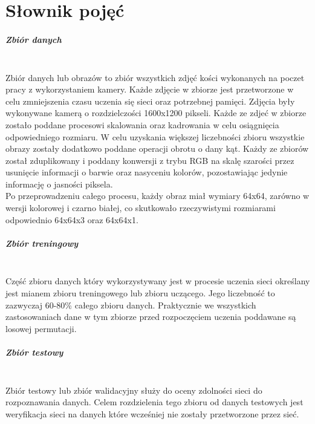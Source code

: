 
\chapter{Słownik pojęć}

\paragraph{Zbiór danych} \mbox{}\\
Zbiór danych lub obrazów to zbiór wszystkich zdjęć kości wykonanych na poczet
pracy z wykorzystaniem kamery. Każde zdjęcie w zbiorze jest przetworzone w celu
zmniejszenia czasu uczenia się sieci oraz potrzebnej pamięci. Zdjęcia były wykonywane
kamerą o rozdzielczości 1600x1200 pikseli. Każde ze zdjeć w zbiorze zostało
poddane procesowi skalowania oraz kadrowania w celu osiągnięcia odpowiedniego
rozmiaru. W celu uzyskania większej liczebności zbioru wszystkie obrazy zostały
dodatkowo poddane operacji obrotu o dany kąt. Każdy ze zbiorów został zduplikowany
i poddany konwersji z trybu RGB na skalę szarości przez usunięcie informacji o barwie
oraz nasyceniu kolorów, pozostawiając jedynie informację o jasności piksela. \\
Po przeprowadzeniu całego procesu, każdy obraz miał wymiary 64x64, zarówno w wersji
kolorowej i czarno białej, co skutkowało rzeczywistymi rozmiarami odpowiednio 64x64x3
oraz 64x64x1.

\paragraph{Zbiór treningowy} \mbox{}\\
Część zbioru danych który wykorzystywany jest w procesie uczenia sieci określany
jest mianem zbioru treningowego lub zbioru uczącego. Jego liczebność to zazwyczaj 60-80\% całego zbioru
danych. Praktycznie we wszystkich zastosowaniach dane w tym zbiorze przed rozpoczęciem
uczenia poddawane są losowej permutacji.

\paragraph{Zbiór testowy} \mbox{}\\
Zbiór testowy lub zbiór walidacyjny służy do oceny zdolności sieci do rozpoznawania
danych. Celem rozdzielenia tego zbioru od danych testowych jest weryfikacja sieci
na danych które wcześniej nie zostały przetworzone przez sieć.

